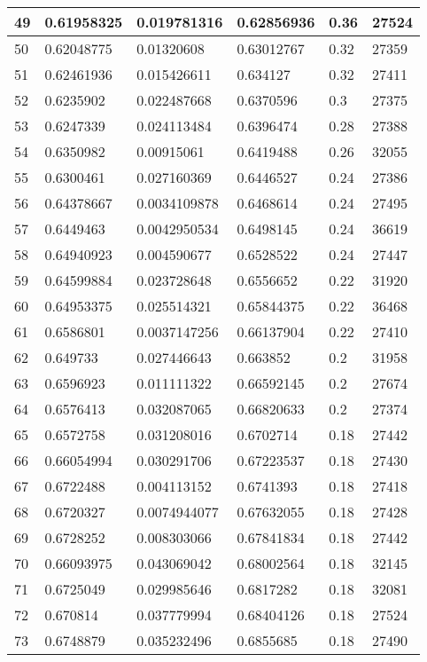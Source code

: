\begin{longtable}{|l|l|l|l|l|l|}
49 & 0.61958325 & 0.019781316 & 0.62856936 & 0.36 & 27524 \\ \hline 
50 & 0.62048775 & 0.01320608 & 0.63012767 & 0.32 & 27359 \\ \hline 
51 & 0.62461936 & 0.015426611 & 0.634127 & 0.32 & 27411 \\ \hline 
52 & 0.6235902 & 0.022487668 & 0.6370596 & 0.3 & 27375 \\ \hline 
53 & 0.6247339 & 0.024113484 & 0.6396474 & 0.28 & 27388 \\ \hline 
54 & 0.6350982 & 0.00915061 & 0.6419488 & 0.26 & 32055 \\ \hline 
55 & 0.6300461 & 0.027160369 & 0.6446527 & 0.24 & 27386 \\ \hline 
56 & 0.64378667 & 0.0034109878 & 0.6468614 & 0.24 & 27495 \\ \hline 
57 & 0.6449463 & 0.0042950534 & 0.6498145 & 0.24 & 36619 \\ \hline 
58 & 0.64940923 & 0.004590677 & 0.6528522 & 0.24 & 27447 \\ \hline 
59 & 0.64599884 & 0.023728648 & 0.6556652 & 0.22 & 31920 \\ \hline 
60 & 0.64953375 & 0.025514321 & 0.65844375 & 0.22 & 36468 \\ \hline 
61 & 0.6586801 & 0.0037147256 & 0.66137904 & 0.22 & 27410 \\ \hline 
62 & 0.649733 & 0.027446643 & 0.663852 & 0.2 & 31958 \\ \hline 
63 & 0.6596923 & 0.011111322 & 0.66592145 & 0.2 & 27674 \\ \hline 
64 & 0.6576413 & 0.032087065 & 0.66820633 & 0.2 & 27374 \\ \hline 
65 & 0.6572758 & 0.031208016 & 0.6702714 & 0.18 & 27442 \\ \hline 
66 & 0.66054994 & 0.030291706 & 0.67223537 & 0.18 & 27430 \\ \hline 
67 & 0.6722488 & 0.004113152 & 0.6741393 & 0.18 & 27418 \\ \hline 
68 & 0.6720327 & 0.0074944077 & 0.67632055 & 0.18 & 27428 \\ \hline 
69 & 0.6728252 & 0.008303066 & 0.67841834 & 0.18 & 27442 \\ \hline 
70 & 0.66093975 & 0.043069042 & 0.68002564 & 0.18 & 32145 \\ \hline 
71 & 0.6725049 & 0.029985646 & 0.6817282 & 0.18 & 32081 \\ \hline 
72 & 0.670814 & 0.037779994 & 0.68404126 & 0.18 & 27524 \\ \hline 
73 & 0.6748879 & 0.035232496 & 0.6855685 & 0.18 & 27490 \\ \hline 

\end{longtable}
